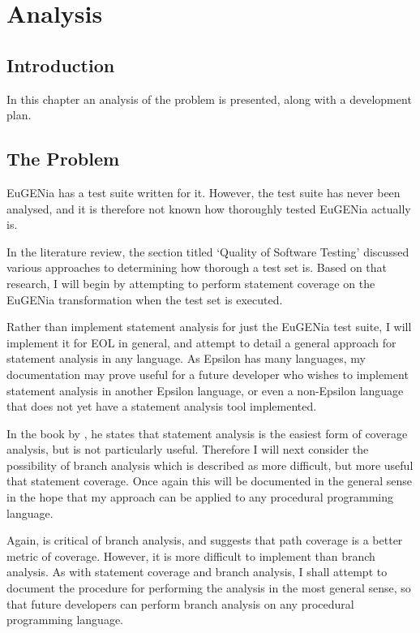 \chapter{Analysis}

\section{Introduction}
In this chapter an analysis of the problem is presented, along with a development plan.

\section{The Problem}

EuGENia has a test suite written for it. However, the test suite has never been analysed, and it is therefore not known how thoroughly tested EuGENia actually is.

In the literature review, the section titled `Quality of Software Testing' discussed various approaches to determining how thorough a test set is. Based on that research, I will begin by attempting to perform statement coverage on the EuGENia transformation when the test set is executed.

Rather than implement statement analysis for just the EuGENia test suite, I will implement it for EOL in general, and attempt to detail a general approach for statement analysis in any language. As Epsilon has many languages, my documentation may prove useful for a future developer who wishes to implement statement analysis in another Epsilon language, or even a non-Epsilon language that does not yet have a statement analysis tool implemented.

In the book by \citet{Myers:2004:AST:983238}, he states that statement analysis is the easiest form of coverage analysis, but is not particularly useful. Therefore I will next consider the possibility of branch analysis which is described as more difficult, but more useful that statement coverage. Once again this will be documented in the general sense in the hope that my approach can be applied to any procedural programming language.

Again, \citet{Myers:2004:AST:983238} is critical of branch analysis, and suggests that path coverage is a better metric of coverage. However, it is more difficult to implement than branch analysis. As with statement coverage and branch analysis, I shall attempt to document the procedure for performing the analysis in the most general sense, so that future developers can perform branch analysis on any procedural programming language.

